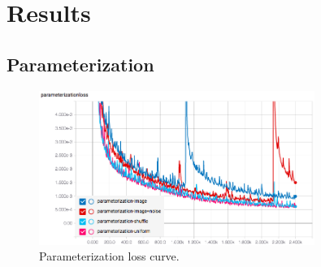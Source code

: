 \documentclass[A4]{article}
\begin{document}
\section{Results}
\subsection{Parameterization}
\begin{figure}[H]
\centering
\includegraphics[width=0.8\textwidth]{parameterization.png}
\caption{\label{fig:parameterization} Parameterization loss curve.}
\end{figure}
\end{document}

